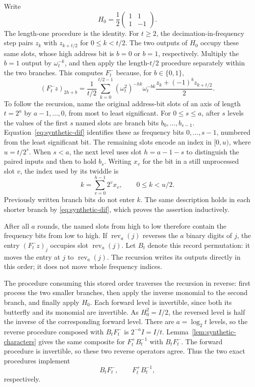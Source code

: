 \documentclass[11pt]{article}
\theoremstyle{definition}
\begin{document}
Write
\[
 H_0=\frac12\begin{pmatrix}1&1\\1&-1\end{pmatrix}.
\]
The length-one procedure is the identity.  For $t\geq2$, the
decimation-in-frequency step pairs $z_k$ with $z_{k+t/2}$ for
$0\leq k<t/2$.  The two outputs of $H_0$ occupy these same slots,
whose high address bit is $b=0$ or $b=1$, respectively.  Multiply
the $b=1$ output by $\omega_t^{-k}$, and then apply the length-$t/2$
procedure separately within the two branches.  This computes
$F_t^-$ because, for $b\in\{0,1\}$,
\begin{equation}
 (F_t^-z)_{2h+b}
 =\frac1{t/2}\sum_{k=0}^{t/2-1}
       (\omega_t^2)^{-hk}\omega_t^{-bk}
       \frac{z_k+(-1)^b z_{k+t/2}}2.
 \label{eq:synthetic-dif}
\end{equation}
To follow the recursion, name the original address-bit slots of an
axis of length $t=2^a$ by $a-1,\ldots,0$, from most to least
significant.  For $0\leq s\leq a$, after $s$ levels the values of
the first $s$ named slots are branch bits $b_0,\ldots,b_{s-1}$.
Equation~\eqref{eq:synthetic-dif} identifies these as frequency bits
$0,\ldots,s-1$, numbered from the least significant bit.  The
remaining slots encode an index in $[0,u)$, where $u=t/2^s$.
When $s<a$, the next level uses slot $h=a-1-s$ to distinguish the
paired inputs and then to hold
$b_s$.  Writing $x_v$ for the bit in a still unprocessed slot $v$,
the index used by its twiddle is
\[
       k=\sum_{v=0}^{h-1}2^v x_v,\qquad 0\leq k<u/2.
\]
Previously written branch bits do not enter $k$.  The same description
holds in each shorter branch by \eqref{eq:synthetic-dif}, which proves
the assertion inductively.

After all $a$ rounds, the named slots from high to low therefore
contain the frequency bits from low to high.  If
$\operatorname{rev}_a(j)$ reverses the $a$ binary digits of $j$, the
entry $(F_t^-z)_j$ occupies slot $\operatorname{rev}_a(j)$.
Let $B_t$ denote this record permutation: it moves the entry at $j$
to $\operatorname{rev}_a(j)$.  The recursion writes its outputs
directly in this order; it does not move whole frequency indices.

The procedure consuming this stored order traverses the recursion in
reverse: first process the two smaller branches, then apply the inverse
monomial to the second branch, and finally apply $H_0$.  Each forward
level is invertible, since both its butterfly and its monomial are
invertible.  As $H_0^2=I/2$, the reversed level is half the inverse
of the corresponding forward level.  There are $a=\log_2t$ levels,
so the reverse procedure composed with $B_tF_t^-$ is
$2^{-a}I=I/t$.  Lemma~\ref{lem:synthetic-characters} gives the same
composite for $F_t^+B_t^{-1}$ with $B_tF_t^-$.  The forward procedure
is invertible, so these two reverse operators agree.  Thus the two
exact procedures implement
\begin{equation}
       B_tF_t^-,\qquad F_t^+B_t^{-1},
 \label{eq:stored-opposite}
\end{equation}
respectively.
\end{document}
